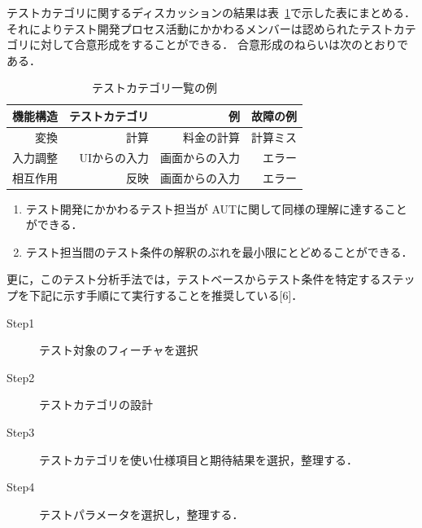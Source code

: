 \documentclass[a4paper,11pt]{jreport}
\begin{document}
テストカテゴリに関するディスカッションの結果は表~\ref{tbl:D-3-tbl1}で示した表にまとめる．それによりテスト開発プロセス活動にかかわるメンバーは認められたテストカテゴリに対して合意形成をすることができる． 合意形成のねらいは次のとおりである．

\begin{table}[t]
\caption{テストカテゴリ一覧の例}
\label{tbl:D-3-tbl1}
\begin{center}
\begin{tabular}{r|r|r|r}
機能構造&テストカテゴリ&例&故障の例\\
\hline
\hline
変換&計算&料金の計算&計算ミス\\
\hline
入力調整&UIからの入力&画面からの入力&エラー\\
\hline
相互作用&反映&画面からの入力&エラー\\
    \hline
\end{tabular}%
\end{center}
\end{table}




\begin{enumerate}
\item テスト開発にかかわるテスト担当が AUTに関して同様の理解に達することができる．
\item テスト担当間のテスト条件の解釈のぶれを最小限にとどめることができる．
\end{enumerate}
更に，このテスト分析手法では，テストベースからテスト条件を特定するステップを下記に示す手順にて実行することを推奨している[6]．

\begin{description}
\item[Step1] テスト対象のフィーチャを選択
\item[Step2] テストカテゴリの設計
\item[Step3] テストカテゴリを使い仕様項目と期待結果を選択，整理する．
\item[Step4] テストパラメータを選択し，整理する．
\end{description}
\end{document}

